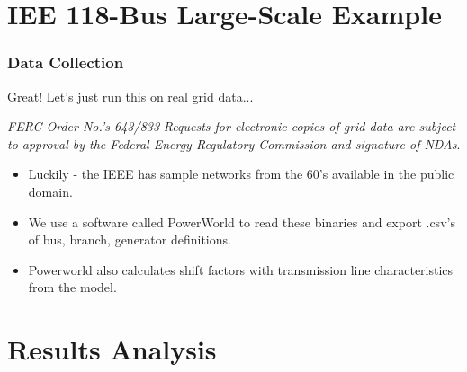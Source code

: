 \documentclass[
    11pt,
]{beamer}
\begin{document}

\section{IEE 118-Bus Large-Scale Example}

\begin{frame}
    \frametitle{Data Collection}
    \small

    Great! Let's just run this on real grid data...

    \begin{alertblock}{\textit{FERC Order No.'s 643/833}}
        \textit{Requests for electronic copies of grid data are subject to approval by the Federal Energy Regulatory Commission and signature of NDAs}.
    \end{alertblock}

    \begin{itemize}
        \item Luckily - the IEEE has sample networks from the 60's available in the public domain.
        \item We use a software called PowerWorld to read these binaries and export \alert{.csv's} of \alert{bus}, \alert{branch}, \alert{generator} definitions.
        \item Powerworld also calculates \alert{shift factors} with transmission line characteristics from the model. 
    \end{itemize}
\end{frame}


\section{Results Analysis}
\end{document}
